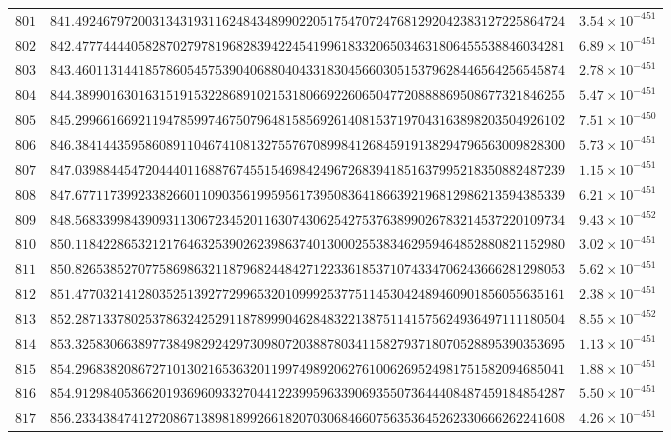 \documentclass[12pt,reqno]{amsart}
\theoremstyle{remark}
\begin{document}
\begin{longtable}{clc}
$801$ & $841.4924679720031343193116248434899022051754707247681292042383127225864724$ & $3.54\times 10^{-451}$ \\
$802$ & $842.4777444405828702797819682839422454199618332065034631806455538846034281$ & $6.89\times 10^{-451}$ \\
$803$ & $843.4601131441857860545753904068804043318304566030515379628446564256545874$ & $2.78\times 10^{-451}$ \\
$804$ & $844.3899016301631519153228689102153180669226065047720888869508677321846255$ & $5.47\times 10^{-451}$ \\
$805$ & $845.2996616692119478599746750796481585692614081537197043163898203504926102$ & $7.51\times 10^{-450}$ \\
$806$ & $846.3841443595860891104674108132755767089984126845919138294796563009828300$ & $5.73\times 10^{-451}$ \\
$807$ & $847.0398844547204440116887674551546984249672683941851637995218350882487239$ & $1.15\times 10^{-451}$ \\
$808$ & $847.6771173992338266011090356199595617395083641866392196812986213594385339$ & $6.21\times 10^{-451}$ \\
$809$ & $848.5683399843909311306723452011630743062542753763899026783214537220109734$ & $9.43\times 10^{-452}$ \\
$810$ & $850.1184228653212176463253902623986374013000255383462959464852880821152980$ & $3.02\times 10^{-451}$ \\
$811$ & $850.8265385270775869863211879682448427122336185371074334706243666281298053$ & $5.62\times 10^{-451}$ \\
$812$ & $851.4770321412803525139277299653201099925377511453042489460901856055635161$ & $2.38\times 10^{-451}$ \\
$813$ & $852.2871337802537863242529118789990462848322138751141575624936497111180504$ & $8.55\times 10^{-452}$ \\
$814$ & $853.3258306638977384982924297309807203887803411582793718070528895390353695$ & $1.13\times 10^{-451}$ \\
$815$ & $854.2968382086727101302165363201199749892062761006269524981751582094685041$ & $1.88\times 10^{-451}$ \\
$816$ & $854.9129840536620193696093327044122399596339069355073644408487459184854287$ & $5.50\times 10^{-451}$ \\
$817$ & $856.2334384741272086713898189926618207030684660756353645262330666262241608$ & $4.26\times 10^{-451}$ \\

\end{longtable}
\end{document}

